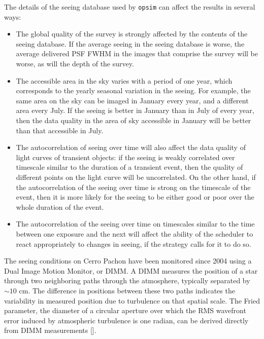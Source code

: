 \documentclass[DM,authoryear,toc]{lsstdoc}
\begin{document}
The details of the seeing database used by \texttt{opsim}
can affect the results in several ways:

\begin{itemize}
  \item The global quality of the survey is strongly affected by the
    contents of the seeing database. If the average seeing in the
    seeing database is worse, the average delivered PSF FWHM in the
    images that comprise the survey will be worse, as will the depth
    of the survey.
  \item The accessible area in the sky varies with a period of one
    year, which corresponds to the yearly seasonal variation in the
    seeing. For example, the same area on the sky can be imaged in
    January every year, and a different area every July. If the seeing
    is better in January than in July of every year, then the data
    quality in the area of sky accessible in January will be better
    than that accessible in July.
  \item The autocorrelation of seeing over time will also affect the
    data quality of light curves of transient objects: if the seeing
    is weakly correlated over timescale similar to the duration of a
    transient event, then the quality of different points on the light
    curve will be uncorrelated. On the other hand, if the
    autocorrelation of the seeing over time is strong on the timescale
    of the event, then it is more likely for the seeing to be either
    good or poor over the whole duration of the event.
  \item The autocorrelation of the seeing over time on timescales
    similar to the time between one exposure and the next will affect
    the ability of the scheduler to react appropriately to changes in
    seeing, if the strategy calls for it to do so.
    
\end{itemize}

The seeing conditions on Cerro Pachon have been monitored since 2004
using a Dual Image Motion Monitor, or DIMM. A DIMM measures the
position of a star through two neighboring paths through the
atmosphere, typically separated by $\sim10 \mbox{ cm}$. The difference
in positions between these two paths indicates the variability in
measured position due to turbulence on that spatial scale. The Fried
parameter, the diameter of a circular aperture over which the RMS
wavefront error induced by atmospheric turbulence is one radian, can
be derived directly from DIMM measurements [\cite{1965JOSA...55.1427F,
    1987PASP...99.1360M, 2002PASP..114.1156T}].
\end{document}
